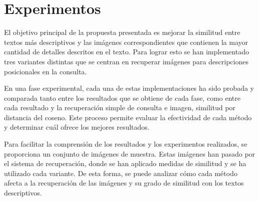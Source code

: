 \section{Experimentos}
El objetivo principal de la propuesta presentada es mejorar la similitud entre textos m\'as descriptivos y las im\'agenes correspondientes que contienen la mayor cantidad de detalles descritos en el texto. Para lograr esto se han implementado tres variantes distintas que se centran en recuperar im\'agenes para descripciones posicionales en la consulta.

En una fase experimental, cada una de estas implementaciones ha sido probada y comparada tanto entre los resultados que se obtiene de cada fase, como entre cada resultado y la recuperación simple de consulta e imagen, similitud por distancia del coseno. Este proceso permite evaluar la efectividad de cada método y determinar cu\'al ofrece los mejores resultados.

Para facilitar la comprensión de los resultados y los experimentos realizados, se proporciona un conjunto de im\'agenes de muestra. Estas im\'agenes han pasado por el sistema de recuperación, donde se han aplicado medidas de similitud y se ha utilizado cada variante. De esta forma, se puede analizar cómo cada método afecta a la recuperación de las im\'agenes y su grado de similitud con los textos descriptivos.


